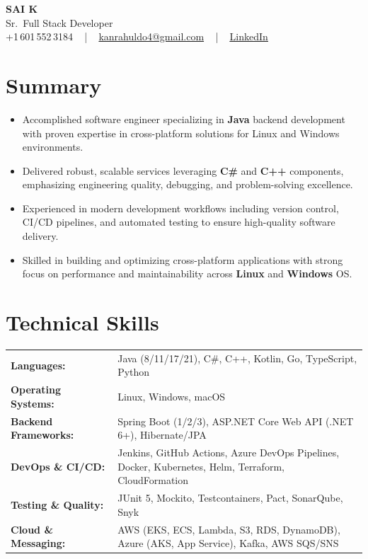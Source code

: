 \documentclass[letterpaper,11pt]{article}
\newcommand{\resumeItem}[1]{
  \item\footnotesize{
    {#1 \vspace{-2pt}}
  }
}
\newcommand{\resumeItemListStart}{\begin{itemize}[leftmargin=*]}
\newcommand{\resumeItemListEnd}{\end{itemize}\vspace{-5pt}}
\begin{document}
\begin{center}
    {\fontsize{14pt}{12pt}\selectfont \textbf{\MakeUppercase{Sai K}}}\\ \vspace{2pt}
    \fontsize{10pt}{12pt}\selectfont Sr.\ Full Stack Developer\\ \vspace{2pt}
    \fontsize{10pt}{12pt}\selectfont +1\,601\,552\,3184 ~ | ~
    \href{mailto:kanrahuldo4@gmail.com}{kanrahuldo4@gmail.com} ~ | ~
    \href{https://www.linkedin.com/in/srrrk/}{\color{blue}\underline{LinkedIn}}
    \vspace{-10pt}
\end{center}

\section{Summary}
\fontsize{9pt}{10pt}\selectfont
\resumeItemListStart
  \resumeItem{Accomplished software engineer specializing in \textbf{Java} backend development with proven expertise in cross-platform solutions for Linux and Windows environments.}
  \resumeItem{Delivered robust, scalable services leveraging \textbf{C\#} and \textbf{C++} components, emphasizing engineering quality, debugging, and problem-solving excellence.}
  \resumeItem{Experienced in modern development workflows including version control, CI/CD pipelines, and automated testing to ensure high-quality software delivery.}
  \resumeItem{Skilled in building and optimizing cross-platform applications with strong focus on performance and maintainability across \textbf{Linux} and \textbf{Windows} OS.}
\resumeItemListEnd
\vspace{-6pt}

\section{Technical Skills}
\vspace{-14pt}
\begin{table}[h]
\fontsize{9pt}{10pt}\selectfont
\begin{tabular}{p{0.3\linewidth} p{0.7\linewidth}}
\textbf{Languages:} & Java (8/11/17/21), C\#, C++, Kotlin, Go, TypeScript, Python \\
\textbf{Operating Systems:} & Linux, Windows, macOS \\
\textbf{Backend Frameworks:} & Spring Boot (1/2/3), ASP.NET Core Web API (.NET 6+), Hibernate/JPA \\
\textbf{DevOps \& CI/CD:} & Jenkins, GitHub Actions, Azure DevOps Pipelines, Docker, Kubernetes, Helm, Terraform, CloudFormation \\
\textbf{Testing \& Quality:} & JUnit 5, Mockito, Testcontainers, Pact, SonarQube, Snyk \\
\textbf{Cloud \& Messaging:} & AWS (EKS, ECS, Lambda, S3, RDS, DynamoDB), Azure (AKS, App Service), Kafka, AWS SQS/SNS \\
\end{tabular}
\end{table}
\vspace{-15pt}
\end{document}
